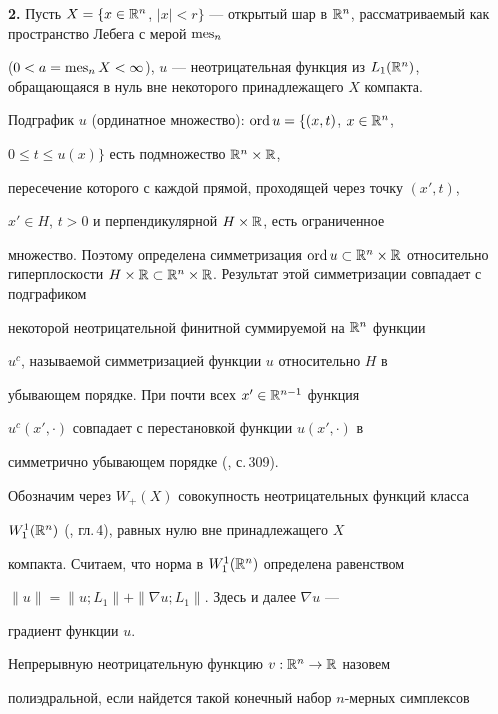 {\bf 2.} Пусть $X=\{x\in\Bbb R^n$, $|x|<r\}$ --- открытый шар в $\Bbb 


R^n$, рассматриваемый как пространство Лебега с мерой $\mes_n$ 


($0<a=\mes_n X<\infty$), $u$ --- неотрицательная функция из $L_1(\Bbb 


R^n)$, обращающаяся в нуль вне некоторого принадлежащего $X$ компакта. 


Подграфик $u$ (ординатное множество): $\operatorname{ord} u=\{(x,t)$, $x\in\Bbb R^n$, 


$0\le t\le u(x)\}$ есть подмножество $\Bbb R^n\times\Bbb R$, 


пересечение которого с каждой прямой, проходящей через точку $(x',t)$, 


$x'\in H$, $t>0$ и перпендикулярной $H\times\Bbb R$, есть ограниченное 


множество. Поэтому определена симметризация $\ord u\subset\Bbb 


R^n\times\Bbb R$ относительно гиперплоскости $H\times\Bbb R\subset\Bbb 


R^n\times\Bbb R$. Результат этой симметризации совпадает с подграфиком 


некоторой неотрицательной финитной суммируемой на $\Bbb R^n$ функции 


$u^c$, называемой симметризацией функции $u$ относительно $H$ в 


убывающем порядке. При почти всех $x'\in\Bbb R^{n-1}$ функция 


$u^c(x',\cdot)$ совпадает с перестановкой функции $u(x',\cdot)$ в 


симметрично убывающем порядке (\cite{9}, с.\,309). 


 


Обозначим через $W_+(X)$ совокупность неотрицательных функций класса 


$W^1_1(\Bbb R^n)$ (\cite{9}, гл.\,4), равных нулю вне принадлежащего $X$ 


компакта. Считаем, что норма в $W^1_1(\Bbb R^n)$ определена равенством 


$\|u\|=\|u;L_1\|+\|\nabla u;L_1\|$. Здесь и далее $\nabla u$ --- 


градиент функции $u$. 


 


Непрерывную неотрицательную функцию $v:\Bbb R^n\to\Bbb R$ назовем 


полиэдральной, если найдется такой конечный набор $n$-мерных симплексов 


